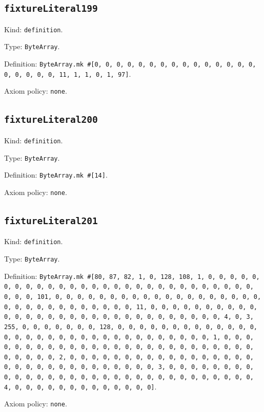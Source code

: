 \documentclass[11pt]{article}
\begin{document}
\subsection*{\texttt{fixtureLiteral199}}
\noindent Kind: \texttt{definition}.\par
\noindent Type: \texttt{ByteArray}.\par
\noindent Definition: \texttt{ByteArray.mk \#[0, 0, 0, 0, 0, 0, 0, 0, 0, 0, 0, 0, 0, 0, 0, 0, 0, 0, 0, 0, 11, 1, 1, 0, 1, 97]}.\par
\noindent Axiom policy: \texttt{none}.\par
\subsection*{\texttt{fixtureLiteral200}}
\noindent Kind: \texttt{definition}.\par
\noindent Type: \texttt{ByteArray}.\par
\noindent Definition: \texttt{ByteArray.mk \#[14]}.\par
\noindent Axiom policy: \texttt{none}.\par
\subsection*{\texttt{fixtureLiteral201}}
\noindent Kind: \texttt{definition}.\par
\noindent Type: \texttt{ByteArray}.\par
\noindent Definition: \texttt{ByteArray.mk \#[80, 87, 82, 1, 0, 128, 108, 1, 0, 0, 0, 0, 0, 0, 0, 0, 0, 0, 0, 0, 0, 0, 0, 0, 0, 0, 0, 0, 0, 0, 0, 0, 0, 0, 0, 0, 0, 0, 0, 101, 0, 0, 0, 0, 0, 0, 0, 0, 0, 0, 0, 0, 0, 0, 0, 0, 0, 0, 0, 0, 0, 0, 0, 0, 0, 0, 0, 0, 0, 0, 0, 11, 0, 0, 0, 0, 0, 0, 0, 0, 0, 0, 0, 0, 0, 0, 0, 0, 0, 0, 0, 0, 0, 0, 0, 0, 0, 0, 0, 0, 0, 0, 4, 0, 3, 255, 0, 0, 0, 0, 0, 0, 0, 128, 0, 0, 0, 0, 0, 0, 0, 0, 0, 0, 0, 0, 0, 0, 0, 0, 0, 0, 0, 0, 0, 0, 0, 0, 0, 0, 0, 0, 0, 0, 0, 0, 1, 0, 0, 0, 0, 0, 0, 0, 0, 0, 0, 0, 0, 0, 0, 0, 0, 0, 0, 0, 0, 0, 0, 0, 0, 0, 0, 0, 0, 0, 0, 0, 2, 0, 0, 0, 0, 0, 0, 0, 0, 0, 0, 0, 0, 0, 0, 0, 0, 0, 0, 0, 0, 0, 0, 0, 0, 0, 0, 0, 0, 0, 0, 0, 3, 0, 0, 0, 0, 0, 0, 0, 0, 0, 0, 0, 0, 0, 0, 0, 0, 0, 0, 0, 0, 0, 0, 0, 0, 0, 0, 0, 0, 0, 0, 0, 4, 0, 0, 0, 0, 0, 0, 0, 0, 0, 0, 0, 0, 0]}.\par
\noindent Axiom policy: \texttt{none}.\par
\end{document}
